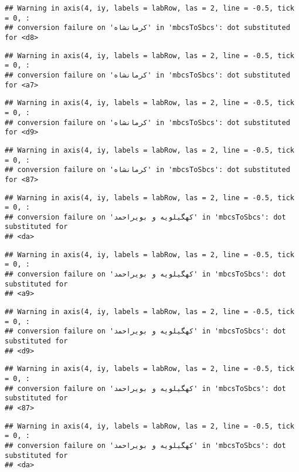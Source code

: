 \documentclass[
]{article}
\begin{document}
\begin{verbatim}
## Warning in axis(4, iy, labels = labRow, las = 2, line = -0.5, tick = 0, :
## conversion failure on 'کرمانشاه' in 'mbcsToSbcs': dot substituted for <d8>
\end{verbatim}

\begin{verbatim}
## Warning in axis(4, iy, labels = labRow, las = 2, line = -0.5, tick = 0, :
## conversion failure on 'کرمانشاه' in 'mbcsToSbcs': dot substituted for <a7>
\end{verbatim}

\begin{verbatim}
## Warning in axis(4, iy, labels = labRow, las = 2, line = -0.5, tick = 0, :
## conversion failure on 'کرمانشاه' in 'mbcsToSbcs': dot substituted for <d9>
\end{verbatim}

\begin{verbatim}
## Warning in axis(4, iy, labels = labRow, las = 2, line = -0.5, tick = 0, :
## conversion failure on 'کرمانشاه' in 'mbcsToSbcs': dot substituted for <87>
\end{verbatim}

\begin{verbatim}
## Warning in axis(4, iy, labels = labRow, las = 2, line = -0.5, tick = 0, :
## conversion failure on 'کهگیلویه و بویراحمد' in 'mbcsToSbcs': dot substituted for
## <da>
\end{verbatim}

\begin{verbatim}
## Warning in axis(4, iy, labels = labRow, las = 2, line = -0.5, tick = 0, :
## conversion failure on 'کهگیلویه و بویراحمد' in 'mbcsToSbcs': dot substituted for
## <a9>
\end{verbatim}

\begin{verbatim}
## Warning in axis(4, iy, labels = labRow, las = 2, line = -0.5, tick = 0, :
## conversion failure on 'کهگیلویه و بویراحمد' in 'mbcsToSbcs': dot substituted for
## <d9>
\end{verbatim}

\begin{verbatim}
## Warning in axis(4, iy, labels = labRow, las = 2, line = -0.5, tick = 0, :
## conversion failure on 'کهگیلویه و بویراحمد' in 'mbcsToSbcs': dot substituted for
## <87>
\end{verbatim}

\begin{verbatim}
## Warning in axis(4, iy, labels = labRow, las = 2, line = -0.5, tick = 0, :
## conversion failure on 'کهگیلویه و بویراحمد' in 'mbcsToSbcs': dot substituted for
## <da>
\end{verbatim}
\end{document}
